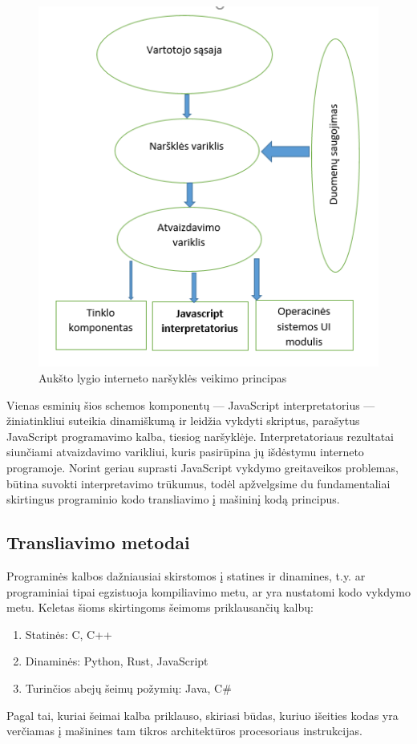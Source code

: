 \documentclass{VUMIFPSkursinis}
\begin{document}
\begin{figure}[h!]
  \begin{center}
  \includegraphics[scale=0.8]{naršyklės_architektūra.png}
  \end{center}
  \caption{Aukšto lygio interneto naršyklės veikimo principas \cite{Rag17}}
  \label{fig:browser_architecture}
\end{figure}

Vienas esminių šios schemos komponentų — JavaScript interpretatorius — žiniatinkliui suteikia dinamiškumą ir leidžia vykdyti skriptus, parašytus JavaScript programavimo kalba, tiesiog naršyklėje. Interpretatoriaus rezultatai siunčiami atvaizdavimo varikliui, kuris pasirūpina jų išdėstymu interneto programoje. \cite{Rag17} Norint geriau suprasti JavaScript vykdymo greitaveikos problemas, būtina suvokti interpretavimo trūkumus, todėl apžvelgsime du fundamentaliai skirtingus programinio kodo transliavimo į mašininį kodą principus.

\subsection{Transliavimo metodai}
Programinės kalbos dažniausiai skirstomos į statines ir dinamines, t.y. ar programiniai tipai egzistuoja kompiliavimo metu, ar yra nustatomi kodo vykdymo metu. Keletas šioms skirtingoms šeimoms priklausančių kalbų:
\begin{enumerate}
    \item Statinės: C, C++
    \item Dinaminės: Python, Rust, JavaScript
    \item Turinčios abejų šeimų požymių: Java, C\#
\end{enumerate} Pagal tai, kuriai šeimai kalba priklauso, skiriasi būdas, kuriuo išeities kodas yra verčiamas į mašinines tam tikros architektūros procesoriaus instrukcijas.
\end{document}
